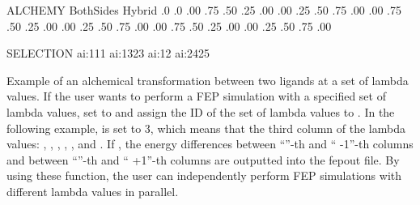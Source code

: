 \documentclass[a4paper,11pt,oneside,english]{sphinxmanual}
\begin{document}
\begin{sphinxVerbatim}[commandchars=\\\{\}]
\PYG{o}{[}ALCHEMY\PYG{o}{]}
  BothSides
   Hybrid
          
          
            
            
  
     
       .0
        .0
        .00 .75 .50 .25 .00
        .00 .25 .50 .75 .00
        .00 .75 .50 .25 .00
        .00 .25 .50 .75 .00
      .00 .75 .50 .25 .00
      .00 .25 .50 .75 .00

\PYG{o}{[}SELECTION\PYG{o}{]}
         ai:1\PYGZhy{}11   
         ai:13\PYGZhy{}23  
         ai:12     
         ai:24\PYGZhy{}25  
\end{sphinxVerbatim}

Example of an alchemical transformation between two ligands at a set of lambda values.
If the user wants to perform a FEP simulation with a specified set of lambda values,
set  to  and assign the ID of the set of lambda values to .
In the following example,  is set to 3, which means that the third column of the lambda values:
, , , , , and .
If , the energy differences between “”-th and “ -1”-th columns and between “”-th and “ +1”-th columns are outputted into the fepout file.
By using these function, the user can independently perform FEP simulations with different lambda values in parallel.
\end{document}

